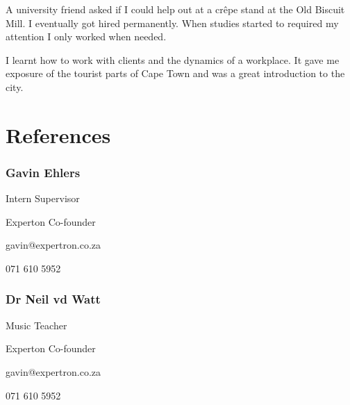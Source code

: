 \documentclass[twocolumn, 8pt]{extarticle}
\begin{document}
A university friend asked if I could help out at a crêpe stand
at the Old Biscuit Mill. I eventually got hired permanently.
When studies started to required my attention I only worked
when needed.

I learnt how to work with clients and the dynamics of a
workplace. It gave me exposure of the tourist parts of Cape
Town and was a great introduction to the city.

\section{References}

\subsubsection{Gavin Ehlers}

Intern Supervisor
\begin{description}
	\setlength\itemsep{-1mm}
	\item Experton Co-founder
	\item gavin@expertron.co.za
	\item 071 610 5952
\end{description}

\subsubsection{Dr Neil vd Watt}

Music Teacher
\begin{description}
	\setlength\itemsep{-1mm}
	\item Experton Co-founder
	\item gavin@expertron.co.za
	\item 071 610 5952
\end{description}

\newpage
\end{document}
